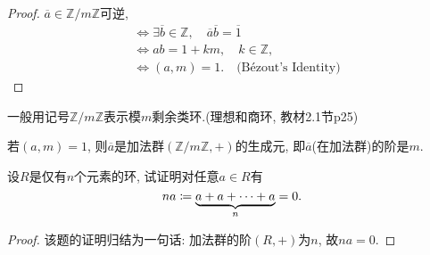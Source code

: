 \documentclass{../solutions-cn}
\begin{document}
\begin{proof}
    $\overline{a} \in \mathbb{Z}/m\mathbb{Z}$可逆, 
    \[
    \begin{aligned}
        &\iff \exists \overline{b} \in \mathbb{Z}, \quad \overline{a}\overline{b} = \overline{1}\\
        &\iff ab = 1 + km, \quad k \in \mathbb{Z},\\
        &\iff (a, m) = 1. \quad \text{(Bézout's Identity)}
    \end{aligned}
    \]
\end{proof}

\begin{remark}
    一般用记号$\mathbb{Z}/m\mathbb{Z}$表示模$m$剩余类环.(理想和商环, 教材2.1节p25)
    
    若$(a, m) = 1$, 则$\overline{a}$是加法群$(\mathbb{Z}/m\mathbb{Z}, +)$的生成元, 即$\overline{a}$(在加法群)的阶是$m$.
\end{remark}

\begin{exercise}[习题1.2.10]
    设$R$是仅有$n$个元素的环, 试证明对任意$a \in R$有
    \[
        na \mathrel{\coloneqq} \underbrace{a + a + \cdots + a}_n = 0.
    \]
\end{exercise}

\begin{proof}
    该题的证明归结为一句话: 加法群的阶$(R, +)$为$n$, 故$na = 0$.
\end{proof}
\end{document}
